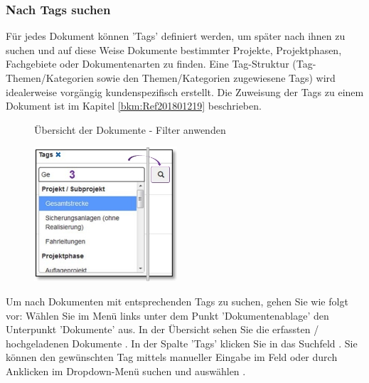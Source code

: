 \subsubsection{Nach Tags suchen}
\label{bkm:Ref442275849}

Für jedes Dokument können 'Tags' definiert werden, um später nach ihnen zu suchen und auf diese Weise Dokumente bestimmter Projekte, Projektphasen, Fachgebiete oder Dokumentenarten zu finden. Eine Tag-Struktur (Tag-Themen/Kategorien sowie den Themen/Kategorien zugewiesene Tags) wird idealerweise vorgängig kundenspezifisch erstellt. Die Zuweisung der Tags zu einem Dokument ist im Kapitel \ref{bkm:Ref201801219} beschrieben.

\begin{figure}[H]
\caption{Übersicht der Dokumente - Filter anwenden}
\end{figure}

\begin{figure}
\vspace{-30pt}
\includegraphics[height=50mm]{../chapters/11_Dokumentenablage/pictures/11-2-8_DokTagHinzufuegen.jpg}
\end{figure}
Um nach Dokumenten mit entsprechenden Tags zu suchen, gehen Sie wie folgt vor:
Wählen Sie im Menü links unter dem Punkt 'Dokumentenablage' den Unterpunkt 'Dokumente' aus. In der Übersicht sehen Sie die erfassten / hochgeladenen Dokumente . In der Spalte 'Tags' klicken Sie in das Suchfeld . Sie können den gewünschten Tag mittels manueller Eingabe im Feld oder durch Anklicken im Dropdown-Menü suchen und auswählen .

